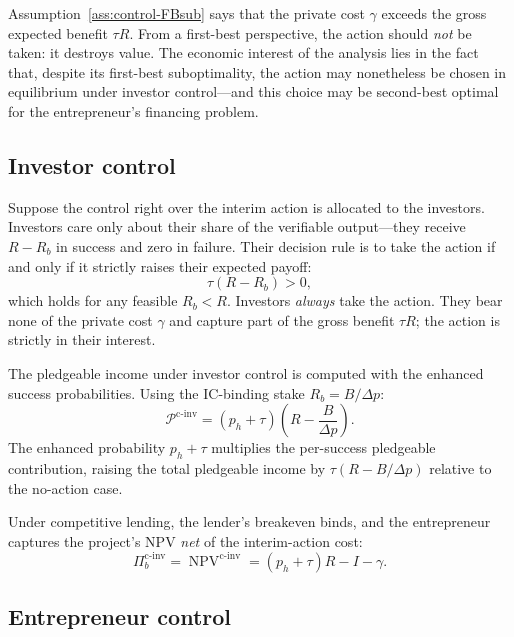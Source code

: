 \documentclass[11pt,a4paper,oneside]{book}
\DeclareMathOperator{\NPV}{NPV}
\theoremstyle{plain}
\theoremstyle{definition}
\theoremstyle{remark}
\numberwithin{equation}{chapter}
\begin{document}
Assumption~\ref{ass:control-FBsub} says that the private cost $\gamma$ exceeds the gross expected benefit $\tau R$.
From a first-best perspective, the action should \emph{not} be taken: it destroys value.
The economic interest of the analysis lies in the fact that, despite its first-best suboptimality, the action may nonetheless be chosen in equilibrium under investor control---and this choice may be second-best optimal for the entrepreneur's financing problem.

\subsection{Investor control}

Suppose the control right over the interim action is allocated to the investors.
Investors care only about their share of the verifiable output---they receive $R - R_b$ in success and zero in failure.
Their decision rule is to take the action if and only if it strictly raises their expected payoff:
\begin{equation*}
  \tau (R - R_b) > 0,
\end{equation*}
which holds for any feasible $R_b < R$.
Investors \emph{always} take the action.
They bear none of the private cost $\gamma$ and capture part of the gross benefit $\tau R$; the action is strictly in their interest.

The pledgeable income under investor control is computed with the enhanced success probabilities.
Using the IC-binding stake $R_b = B/\Delta p$:
\begin{equation}\label{eq:control-P-investor}
  \mathcal{P}^{\text{c-inv}} = (p_h + \tau)\left(R - \frac{B}{\Delta p}\right).
\end{equation}
The enhanced probability $p_h + \tau$ multiplies the per-success pledgeable contribution, raising the total pledgeable income by $\tau(R - B/\Delta p)$ relative to the no-action case.

Under competitive lending, the lender's breakeven binds, and the entrepreneur captures the project's NPV \emph{net} of the interim-action cost:
\begin{equation}\label{eq:control-Pi-investor}
  \Pi_b^{\text{c-inv}} = \NPV^{\text{c-inv}} = (p_h + \tau) R - I - \gamma.
\end{equation}

\subsection{Entrepreneur control}
\end{document}
